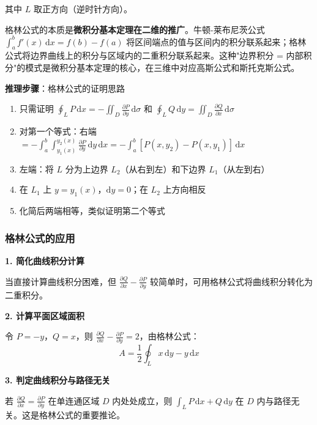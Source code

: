 其中 $L$ 取正方向（逆时针方向）。

\begin{essencebox}
格林公式的本质是\textbf{微积分基本定理在二维的推广}。牛顿-莱布尼茨公式 $\int_a^b f'(x)\,\mathrm{d}x = f(b)-f(a)$ 将区间端点的值与区间内的积分联系起来；格林公式将边界曲线上的积分与区域内的二重积分联系起来。这种"边界积分 = 内部积分"的模式是微积分基本定理的核心，在三维中对应高斯公式和斯托克斯公式。
\end{essencebox}

\begin{insightbox}
\textbf{推理步骤}：格林公式的证明思路
\begin{enumerate}[leftmargin=2em]
    \item 只需证明 $\oint_L P\,\mathrm{d}x = -\iint_D \frac{\partial P}{\partial y}\,\mathrm{d}\sigma$ 和 $\oint_L Q\,\mathrm{d}y = \iint_D \frac{\partial Q}{\partial x}\,\mathrm{d}\sigma$
    \item 对第一个等式：右端 $= -\int_a^b\int_{y_1(x)}^{y_2(x)}\frac{\partial P}{\partial y}\,\mathrm{d}y\,\mathrm{d}x = -\int_a^b[P(x,y_2)-P(x,y_1)]\,\mathrm{d}x$
    \item 左端：将 $L$ 分为上边界 $L_2$（从右到左）和下边界 $L_1$（从左到右）
    \item 在 $L_1$ 上 $y=y_1(x)$，$\mathrm{d}y=0$；在 $L_2$ 上方向相反
    \item 化简后两端相等，类似证明第二个等式
\end{enumerate}
\end{insightbox}

\subsubsection{格林公式的应用}

\textbf{1. 简化曲线积分计算}

当直接计算曲线积分困难，但 $\frac{\partial Q}{\partial x} - \frac{\partial P}{\partial y}$ 较简单时，可用格林公式将曲线积分转化为二重积分。

\textbf{2. 计算平面区域面积}

令 $P=-y$，$Q=x$，则 $\frac{\partial Q}{\partial x}-\frac{\partial P}{\partial y}=2$，由格林公式：
\[
A = \frac{1}{2}\oint_L x\,\mathrm{d}y - y\,\mathrm{d}x
\]

\textbf{3. 判定曲线积分与路径无关}

若 $\frac{\partial Q}{\partial x} = \frac{\partial P}{\partial y}$ 在单连通区域 $D$ 内处处成立，则 $\int_L P\,\mathrm{d}x + Q\,\mathrm{d}y$ 在 $D$ 内与路径无关。这是格林公式的重要推论。

